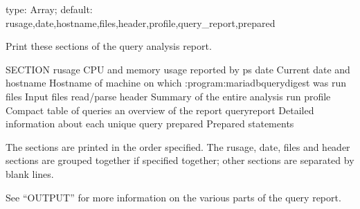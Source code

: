 \documentclass[letterpaper,10pt,english]{sphinxmanual}
\begin{document}
\begin{fulllineitems}
\label{\detokenize{mariadb-query-digest:cmdoption-mariadb-query-digest-report-format}}
\sphinxAtStartPar
type: Array; default: rusage,date,hostname,files,header,profile,query\_report,prepared

\sphinxAtStartPar
Print these sections of the query analysis report.

\begin{sphinxVerbatim}[commandchars=\\\{\}]
SECTION      
 
rusage       CPU  and memory usage reported by ps
date         Current  date and 
hostname     Hostname of machine on which :program:mariadb\PYGZhy{}query\PYGZhy{}digest was run
files        Input files read/parse
header       Summary of the entire analysis run
profile      Compact table of queries  an overview of the report
query\PYGZus{}report Detailed information about each unique query
prepared     Prepared statements
\end{sphinxVerbatim}

\sphinxAtStartPar
The sections are printed in the order specified.  The rusage, date, files and
header sections are grouped together if specified together; other sections are
separated by blank lines.

\sphinxAtStartPar
See “OUTPUT” for more information on the various parts of the query report.

\end{fulllineitems}

\end{document}
